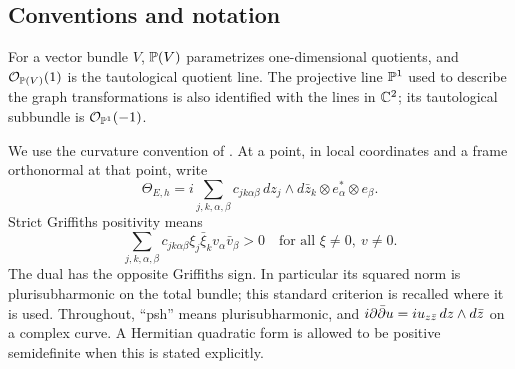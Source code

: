 \subsection*{Conventions and notation}

For a vector bundle $V$, $\mathbb P(V)$ parametrizes one-dimensional
quotients, and $\mathcal O_{\mathbb P(V)}(1)$ is the tautological quotient line.
The projective line $\mathbb P^1$ used to describe the graph transformations
is also identified with the lines in $\mathbb C^2$; its tautological
subbundle is $\mathcal O_{\mathbb P^1}(-1)$.

We use the curvature convention of \cite{Demailly2021}. At a point,
in local coordinates and a frame orthonormal at that point, write
\[
 \Theta_{E,h}
 =i\sum_{j,k,\alpha,\beta}
 c_{jk\alpha\beta}\,dz_j\wedge d\bar z_k
 \otimes e_\alpha^*\otimes e_\beta.
\]
Strict Griffiths positivity means
\[
 \sum_{j,k,\alpha,\beta}
 c_{jk\alpha\beta}\xi_j\bar\xi_k v_\alpha\bar v_\beta>0
 \quad\text{for all }\xi\ne0,\ v\ne0.
\]
The dual has the opposite Griffiths sign. In particular its squared
norm is plurisubharmonic on the total bundle; this standard criterion
is recalled where it is used. Throughout, ``psh'' means
plurisubharmonic, and
$i\partial\bar\partial u=i u_{z\bar z}\,dz\wedge d\bar z$ on a complex curve.
A Hermitian quadratic form is allowed to be positive semidefinite
when this is stated explicitly.
